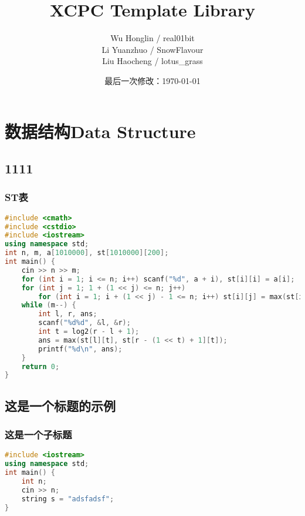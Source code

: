 \documentclass[12pt, a4paper]{book}
\title{\Huge XCPC Template Library}
\author{
    Wu Honglin / real01bit \\
    Li Yuanzhuo / SnowFlavour \\
    Liu Haocheng / lotus\_grass \\
}
\date{最后一次修改：\today}
\begin{document}
\maketitle
\chapter{数据结构Data Structure}
\section{1111}
\subsection{ST表}
\begin{lstlisting}[language={C++}]
#include <cmath>
#include <cstdio>
#include <iostream>
using namespace std;
int n, m, a[1010000], st[1010000][200];
int main() {
    cin >> n >> m;
    for (int i = 1; i <= n; i++) scanf("%d", a + i), st[i][i] = a[i];
    for (int j = 1; 1 + (1 << j) <= n; j++)
        for (int i = 1; i + (1 << j) - 1 <= n; i++) st[i][j] = max(st[i][j - 1], st[i + (1 << j - 1)][j - 1]);
    while (m--) {
        int l, r, ans;
        scanf("%d%d", &l, &r);
        int t = log2(r - l + 1);
        ans = max(st[l][t], st[r - (1 << t) + 1][t]);
        printf("%d\n", ans);
    }
    return 0;
}
\end{lstlisting}
\section{这是一个标题的示例}
\subsection{这是一个子标题}
\begin{lstlisting}[language={C++}]
#include <iostream>
using namespace std;
int main() {
    int n;
    cin >> n;
    string s = "adsfadsf";
}
\end{lstlisting}
\end{document}
